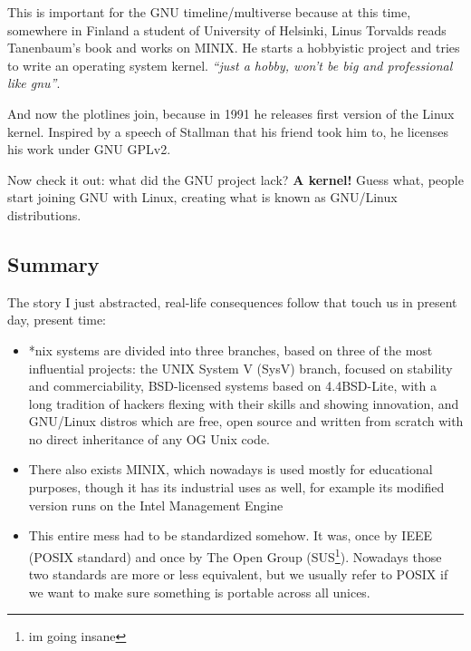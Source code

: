 \documentclass[../ops.tex]{subfiles}
\begin{document}
        This is important for the GNU timeline/multiverse because at this time,
        somewhere in Finland a student of University of Helsinki, Linus Torvalds
        reads Tanenbaum's book and works on MINIX. He starts a hobbyistic
        project and tries to write an operating system kernel. \emph{``just a
        hobby, won't be big and professional like gnu''}.

        And now the plotlines join, because in 1991 he releases first version of
        the Linux kernel. Inspired by a speech of Stallman that his friend took
        him to, he licenses his work under GNU GPLv2.

        Now check it out: what did the GNU project lack? {\bf A kernel!} Guess
        what, people start joining GNU with Linux, creating what is known as
        GNU/Linux distributions.

        \subsection{Summary}
        The story I just abstracted, real-life consequences follow that touch us
        in present day, present time:
        \begin{itemize}
                \item *nix systems are divided into three branches, based on
                        three of the most influential projects: the UNIX System
                        V (SysV) branch, focused on stability and
                        commerciability, BSD-licensed systems based on
                        4.4BSD-Lite, with a long tradition of hackers flexing
                        with their skills and showing innovation, and GNU/Linux
                        distros which are free, open source and written from
                        scratch with no direct inheritance of any OG Unix code.
                \item There also exists MINIX, which nowadays is used mostly
                        for educational purposes, though it has its industrial
                        uses as well, for example its modified version runs on
                        the Intel Management Engine
                \item This entire mess had to be standardized somehow. It was,
                        once by IEEE (POSIX standard) and once by The Open Group
                        (SUS\footnote{im going insane}). Nowadays those two
                        standards are more or less equivalent, but we usually
                        refer to POSIX if we want to make sure something is
                        portable across all unices.
        \end{itemize}
\end{document}
